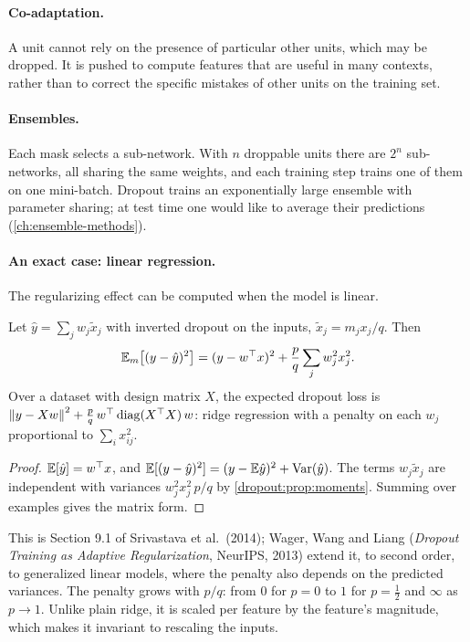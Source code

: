 \begin{notechapter}
\paragraph{Co-adaptation.} A unit cannot rely on the presence of particular other units,
which may be dropped. It is pushed to compute features that are useful in many contexts,
rather than to correct the specific mistakes of other units on the training set.

\paragraph{Ensembles.} Each mask selects a sub-network. With $n$ droppable units there are
$2^n$ sub-networks, all sharing the same weights, and each training step trains one of them on
one mini-batch. Dropout trains an exponentially large ensemble with parameter sharing; at
test time one would like to average their predictions (\cref{ch:ensemble-methods}).

\paragraph{An exact case: linear regression.} The regularizing effect can be computed when
the model is linear.

\begin{proposition}\label{dropout:prop:ridge}
Let $\hat y = \sum_jw_j\tilde x_j$ with inverted dropout on the inputs, $\tilde x_j = m_jx_j/q$. Then
\[
  \mathbb{E}_m\bigl[(y - \hat y)^2\bigr] = (y - w^\top x)^2 + \frac pq\sum_jw_j^2x_j^2 .
\]
Over a dataset with design matrix $X$, the expected dropout loss is
$\left\|y - Xw\right\|^2 + \frac pq\,w^\top\operatorname{diag}(X^\top X)\,w$: ridge regression with a penalty on each $w_j$ proportional to
$\sum_ix_{ij}^2$.
\end{proposition}

\begin{proof}
$\mathbb{E}[\hat y] = w^\top x$, and $\mathbb{E}[(y - \hat y)^2] = (y - \mathbb{E}\hat y)^2 + \operatorname{Var}(\hat y)$. The terms $w_j\tilde x_j$ are independent with variances
$w_j^2x_j^2\,p/q$ by \cref{dropout:prop:moments}. Summing over examples gives the matrix form.
\end{proof}

This is Section 9.1 of Srivastava et al.\ (2014); Wager, Wang and Liang (\emph{Dropout Training
as Adaptive Regularization}, NeurIPS, 2013) extend it, to second order, to generalized
linear models, where the penalty also depends on the predicted variances. The penalty grows
with $p/q$: from $0$ for $p = 0$ to $1$ for $p = \frac12$ and $\infty$ as $p\to1$. Unlike plain ridge, it is scaled per feature
by the feature's magnitude, which makes it invariant to rescaling the inputs.


\end{notechapter}
